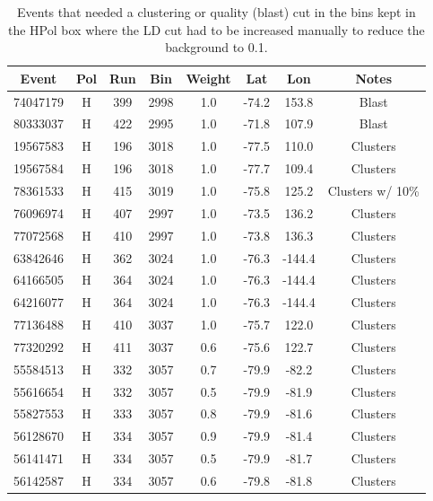 \begin{table}
\centering
\begin{tabular}{ |c|c|c|c|c|c|c|c| } 
\hline

Event & Pol & Run & Bin & Weight & Lat & Lon & Notes \\
\hline
74047179 & H & 399 & 2998 & 1.0 & -74.2 & 153.8 & {\color{red} Blast}\\
80333037 & H & 422 & 2995 & 1.0 & -71.8 & 107.9 & {\color{red} Blast}\\
19567583 & H & 196 & 3018 & 1.0 & -77.5 & 110.0 & Clusters\\ 
19567584 & H & 196 & 3018 & 1.0 & -77.7 & 109.4 & Clusters\\
78361533 & H & 415 & 3019 & 1.0 & -75.8 & 125.2 & Clusters w/ 10\%\\
76096974 & H & 407 & 2997 & 1.0 & -73.5 & 136.2 & Clusters\\ 
77072568 & H & 410 & 2997 & 1.0 & -73.8 & 136.3 & Clusters\\ 
63842646 & H & 362 & 3024 & 1.0 & -76.3 & -144.4 & Clusters\\ 
64166505 & H & 364 & 3024 & 1.0 & -76.3 & -144.4 & Clusters\\ 
64216077 & H & 364 & 3024 & 1.0 & -76.3 & -144.4 & Clusters\\
77136488 & H & 410 & 3037 & 1.0 & -75.7 & 122.0 & Clusters\\
77320292 & H & 411 & 3037 & 0.6 & -75.6 & 122.7 & Clusters\\
55584513 & H & 332 & 3057 & 0.7 & -79.9 & -82.2 & Clusters\\
55616654 & H & 332 & 3057 & 0.5 & -79.9 & -81.9 & Clusters\\ 
55827553 & H & 333 & 3057 & 0.8 & -79.9 & -81.6 & Clusters\\
56128670 & H & 334 & 3057 & 0.9 & -79.9 & -81.4 & Clusters\\
56141471 & H & 334 & 3057 & 0.5 & -79.9 & -81.7 & Clusters\\
56142587 & H & 334 & 3057 & 0.6 & -79.8 & -81.8 & Clusters\\
\hline
\end{tabular}
\caption{Events that needed a clustering or quality (blast) cut in the bins kept in the HPol box where the LD cut had to be increased manually to reduce the background to 0.1.}
\label{high_bg_hpol_bins}
\end{table}


